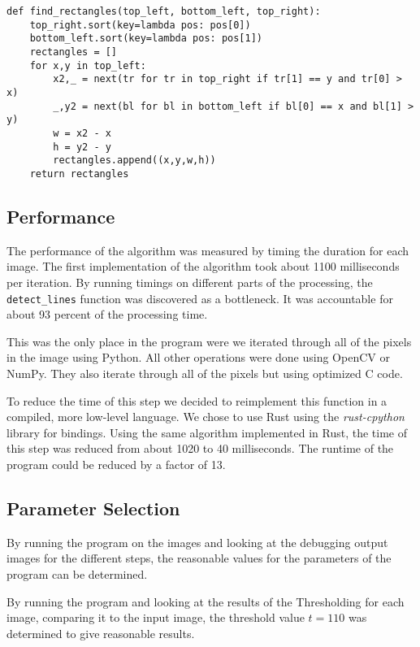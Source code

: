 \begin{minipage}{\linewidth}
\begin{lstlisting}[label=lst:findrectangles,caption=Function for constructing rectangles from corners]
def find_rectangles(top_left, bottom_left, top_right):
    top_right.sort(key=lambda pos: pos[0])
    bottom_left.sort(key=lambda pos: pos[1])
    rectangles = []
    for x,y in top_left:
        x2,_ = next(tr for tr in top_right if tr[1] == y and tr[0] > x)
        _,y2 = next(bl for bl in bottom_left if bl[0] == x and bl[1] > y)
        w = x2 - x
        h = y2 - y
        rectangles.append((x,y,w,h))
    return rectangles
\end{lstlisting}
\end{minipage}

\subsection{Performance} \label{performance}

The performance of the algorithm was measured by timing the duration for each
image. The first implementation of the algorithm took about 1100 milliseconds per
iteration. By running timings on different parts of the processing, the
\texttt{detect\_lines} function was discovered as a bottleneck. It was
accountable for about 93 percent of the processing time.

This was the only place in the program were we iterated through all of the pixels
in the image using Python. All other operations were done using OpenCV or NumPy.
They also iterate through all of the pixels but using optimized C code.

To reduce the time of this step we decided to reimplement this function in a
compiled, more low-level language. We chose to use Rust using the \textit{rust-cpython}
library for bindings. Using the same algorithm implemented in Rust, the time of
this step was reduced from about 1020 to 40 milliseconds. The runtime of the
program could be reduced by a factor of 13.

\subsection{Parameter Selection} \label{parameter}

By running the program on the images and looking at the debugging output images
for the different steps, the reasonable values for the parameters of the program
can be determined.

By running the program and looking at the results of the Thresholding for each
image, comparing it to the input image, the threshold value $t = 110$ was
determined to give reasonable results.

